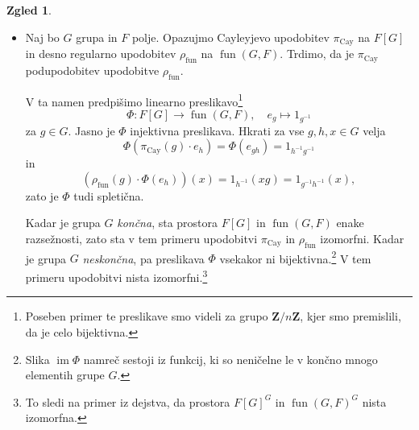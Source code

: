\documentclass[11pt]{book}
\def\ZZ{\mathbf{Z}}
\def\11{\mathbf{1}}
\DeclareMathOperator\image{im}
\DeclareMathOperator\fun{fun}
\DeclareMathOperator\Cay{Cay}
\theoremstyle{definition}
\theoremstyle{zgled}
\newtheorem*{zgled}{Zgled}
\theoremstyle{odprtproblem}
\theoremstyle{domacanaloga}
\theoremstyle{izrek}
\begin{document}
\begin{zgled}
\begin{itemize}
    Torej za vsak $g \in G$ obstaja $\chi(g) \in F$, da je $\rho(g) \cdot v = \chi(g) v$. Na ta način dobimo funkcijo $\chi \colon G \to F$, se pravi element prostora $\fun(G,F)$. Ta funkcija ni čisto poljubna; ker je $\rho$ upodobitev, je $\chi$ nujno {\em homomorfizem} iz grupe $G$ v grupo $F^*$. Torej je $\chi$ pravzaprav upodobitev grupe $G$ na prostoru $F$ razsežnosti $1$.\footnote{Kadar je $\chi(g) = 1$ za vsak $g \in G$, je ta upodobitev izomorfna $\11$. Kadar je $\chi(g) \neq 1$ za vsaj kak $g \in G$, pa ta upodobitev \emph{ni} trivialna.} 
    
    Zdaj kot v zadnjem zgledu s predpisom
    \[
        \Phi \colon F \to V, \quad
        x \mapsto xv
    \]
    dobimo injektivno spletično med $\chi$ in $\rho$, torej lahko vidimo $\chi$ kot enorazsežno podupodobitev upodobitve $\rho$. Hkrati lahko iz te spletične obnovimo podatek o skupnem lastnem vektorju $v$ in upodobitvi $\chi$.\footnote{Namreč, $v = \Phi(1)$ in $\chi(g) = \rho(g) \cdot 1$.} 
    
    Torej smo vzpostavili bijektivno korespondenco med množico enorazsežnih podupodobitev upodobitve $\rho$ in skupnimi lastnimi vektorji vseh preslikav $\rho(g)$ za $g \in G$.

    Poseben primer te korespondence je zadnji zgled. Množico enorazsežnih trivialnih podupodobitev upodobitve $\rho$ lahko identificiramo z množico neničelnih spletičen $\hom_G(\11, V) \backslash \{ x \mapsto 0 \}$, ta pa ustreza skupnim lastnim vektorjem $\rho(g)$ za $g \in G$ z lastno vrednostjo $1$, kar je ravno množica $V^G \backslash \{ 0 \}$.

    \item Naj bo $G$ grupa in $F$ polje. Opazujmo Cayleyjevo upodobitev $\pi_{\Cay}$ na $F[G]$ in desno regularno upodobitev $\rho_{\fun}$ na $\fun(G,F)$. Trdimo, da je $\pi_{\Cay}$ podupodobitev upodobitve $\rho_{\fun}$.
    
    V ta namen predpišimo linearno preslikavo\footnote{Poseben primer te preslikave smo videli za grupo $\ZZ/n\ZZ$, kjer smo premislili, da je celo bijektivna.}
    \[
        \Phi \colon F[G] \to \fun(G,F), \quad
        e_g \mapsto 1_{g^{-1}}
    \]
    za $g \in G$. Jasno je $\Phi$ injektivna preslikava. Hkrati za vse $g,h,x \in G$ velja
    \[
        \Phi(\pi_{\Cay}(g) \cdot e_h) 
        = \Phi(e_{gh})
        = 1_{h^{-1} g^{-1}}
    \]
    in
    \[
        \left( \rho_{\fun}(g) \cdot \Phi(e_h) \right)(x)
        = 1_{h^{-1}}(xg)
        = 1_{g^{-1} h^{-1}}(x),
    \]
    zato je $\Phi$ tudi spletična.

    Kadar je grupa $G$ \emph{končna}, sta prostora $F[G]$ in $\fun(G,F)$ enake razsežnosti, zato sta v tem primeru upodobitvi $\pi_{\Cay}$ in $\rho_{\fun}$ izomorfni. Kadar je grupa $G$ \emph{neskončna}, pa preslikava $\Phi$ vsekakor ni bijektivna.\footnote{Slika $\image \Phi$ namreč sestoji iz funkcij, ki so neničelne le v končno mnogo elementih grupe $G$.} V tem primeru upodobitvi nista izomorfni.\footnote{To sledi na primer iz dejstva, da prostora $F[G]^G$ in $\fun(G,F)^G$ nista izomorfna.}
\end{itemize}
\end{zgled}
\end{document}
